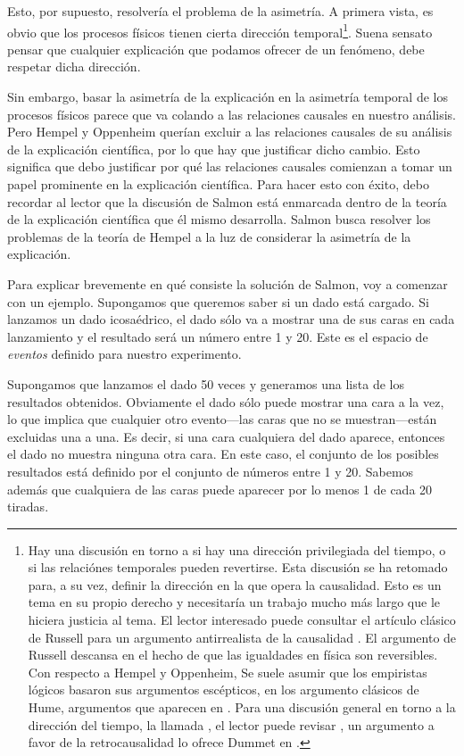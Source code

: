 Esto, por supuesto, resolvería el problema de la asimetría. A primera vista, es obvio que los procesos físicos tienen cierta dirección temporal\footnote{
	Hay	una discusión en torno a si hay una dirección privilegiada del	tiempo, o si las relaciónes temporales pueden revertirse. Esta discusión se ha retomado para, a su vez, definir la dirección en la que opera la causalidad. Esto es un tema en su propio derecho y necesitaría un trabajo mucho más largo que le hiciera justicia al tema. El lector interesado puede consultar	el artículo clásico de Russell para un argumento antirrealista de la	causalidad \parencite{onthecauserussell}. El argumento	de Russell descansa en el hecho de que las igualdades en	física son reversibles. Con respecto a Hempel y Oppenheim, Se suele asumir que los empiristas lógicos basaron sus	argumentos escépticos, en los argumento clásicos de Hume,	argumentos que aparecen en	\parencite{hume1784}. Para	una discusión general en torno a la	dirección del tiempo,	la llamada , el lector	puede	revisar \parencite{utmArrowTime}, un argumento a favor de la	retrocausalidad lo ofrece Dummet en \parencite{dummetcause}.
}.
Suena sensato pensar que cualquier explicación que podamos ofrecer de un fenómeno, debe respetar dicha dirección.

Sin embargo, basar la asimetría de la explicación en
la asimetría temporal de los procesos físicos parece
que va colando a las relaciones causales en nuestro
análisis. Pero Hempel y Oppenheim querían excluir a
las relaciones causales de su análisis de la
explicación científica, por lo que hay que justificar
dicho cambio. Esto significa que debo justificar por
qué las relaciones causales comienzan a tomar un papel
prominente en la explicación científica. Para hacer
esto con éxito, debo recordar al lector que la
discusión de Salmon está enmarcada dentro de la teoría
de la explicación científica que él mismo desarrolla.
Salmon busca resolver los problemas de la teoría
de Hempel a la luz de considerar la asimetría de la
explicación.

Para explicar brevemente en qué consiste la solución
de Salmon, voy a comenzar con un ejemplo. Supongamos
que queremos saber si un dado está cargado. Si
lanzamos un dado icosaédrico, el dado sólo va a
mostrar una de sus caras en cada lanzamiento y el
resultado será un número entre 1 y 20. Este es el
espacio de \emph{eventos} definido para nuestro
experimento.

Supongamos que lanzamos el dado 50 veces y generamos una lista de los resultados obtenidos. Obviamente el dado sólo puede mostrar una cara a la vez, lo que implica que cualquier otro evento---las caras que no se muestran---están excluidas una a una. Es decir, si una cara cualquiera del dado aparece, entonces el dado no muestra ninguna otra cara. En este caso, el conjunto de los posibles resultados está definido por el conjunto de números entre 1 y 20. Sabemos además que cualquiera de las caras puede aparecer por lo menos 1 de cada 20 tiradas.

